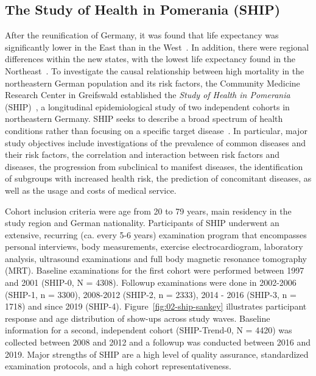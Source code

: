 \documentclass[
  oneside]{book}
\begin{document}
\hypertarget{background-data-ship}{%
\subsection{The Study of Health in Pomerania (SHIP)}\label{background-data-ship}}

After the reunification of Germany, it was found that life expectancy was significantly lower in the East than in the West~\autocite{volzke2015prevalence}.
In addition, there were regional differences within the new states, with the lowest life expectancy found in the Northeast~\autocite{volzke2015prevalence,wiesner2004life}.
To investigate the causal relationship between high mortality in the northeastern German population and its risk factors, the Community Medicine Research Center in Greifswald established the \emph{Study of Health in Pomerania} (SHIP)~\autocite{Voelzke:SHIP11}, a longitudinal epidemiological study of two independent cohorts in northeastern Germany.
SHIP seeks to describe a broad spectrum of health conditions rather than focusing on a specific target disease~\autocite{Voelzke:SHIP11}.
In particular, major study objectives include investigations of the prevalence of common diseases and their risk factors, the correlation and interaction between risk factors and diseases, the progression from subclinical to manifest diseases, the identification of subgroups with increased health risk, the prediction of concomitant diseases, as well as the usage and costs of medical service.

Cohort inclusion criteria were age from 20 to 79 years, main residency in the study region and German nationality.
Participants of SHIP underwent an extensive, recurring (ca. every 5-6 years) examination program that encompasses personal interviews, body measurements, exercise electrocardiogram, laboratory analysis, ultrasound examinations and full body magnetic resonance tomography (MRT).
Baseline examinations for the first cohort were performed between 1997 and 2001 (SHIP-0, N = 4308).
Followup examinations were done in 2002-2006 (SHIP-1, n = 3300), 2008-2012 (SHIP-2, n = 2333), 2014 - 2016 (SHIP-3, n = 1718) and since 2019 (SHIP-4).
Figure~\ref{fig:02-ship-sankey} illustrates participant response and age distribution of show-ups across study waves.
Baseline information for a second, independent cohort (SHIP-Trend-0, N = 4420) was collected between 2008 and 2012 and a followup was conducted between 2016 and 2019.
Major strengths of SHIP are a high level of quality assurance, standardized examination protocols, and a high cohort representativeness.
\end{document}
